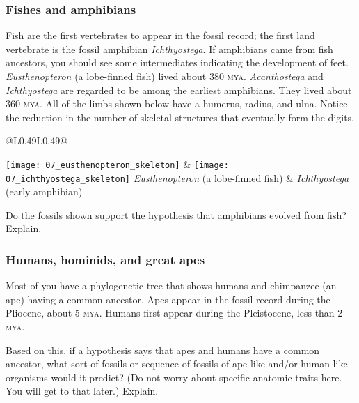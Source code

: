 \documentclass[12pt, hidelinks]{exam}
\begin{document}
\begin{questions}
\newpage


\subsubsection*{Fishes and amphibians}

Fish are the first vertebrates to appear in the fossil record; the first
land vertebrate is the fossil amphibian \emph{Ichthyostega}. If
amphibians came from fish ancestors, you should see some intermediates
indicating the development of feet. \textit{Eusthenopteron} (a lobe-finned
fish) lived about 380 \textsc{mya}. \textit{Acanthostega} and \textit{Ichthyostega} are regarded to be among 
 the earliest amphibians. They lived about 360 \textsc{mya}. All of the limbs shown below have a humerus, radius, and ulna. Notice the reduction in the number of skeletal structures that eventually form the digits.


\begin{longtable}[c]{@{}L{0.49\textwidth}L{0.49\textwidth}@{}}

\texttt{[image: 07\_eusthenopteron\_skeleton]} &
\texttt{[image: 07\_ichthyostega\_skeleton]} \tabularnewline
\textit{Eusthenopteron} (a lobe-finned fish) & \emph{Ichthyostega} (early amphibian)\tabularnewline

\tabularnewline
{}\tabularnewline

\end{longtable}


\question[3]
Do the fossils shown support the hypothesis that amphibians
evolved from fish? Explain.



\newpage

\subsubsection*{Humans, hominids, and great apes}

Most of you have a phylogenetic tree that shows humans and chimpanzee (an ape)
having a common ancestor. Apes appear in the fossil record
during the Pliocene, about 5 \textsc{mya}. Humans first appear
during the Pleistocene, less than 2 \textsc{mya}. 

\question[2]
Based on this, if a hypothesis says that apes and
humans have a common ancestor, what sort of fossils or sequence of
fossils of ape-like and/or human-like organisms would it predict? (Do not
worry about specific anatomic traits here. You will get to that later.)
Explain.


\end{questions}
\end{document}

